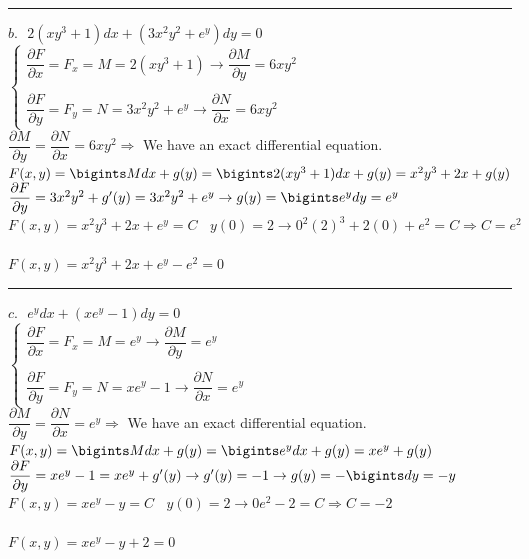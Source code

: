 \documentclass[fleqn]{article}
\begin{document}
\begin{enumerate}
      \textcolor{hwColor}{  
        \rule{15cm}{0.4pt}  
      }

      \textcolor{hwColor}{ 
        $b. ~~~ 2(xy^3+1)dx+(3x^2y^2+e^y)dy=0$ \\
        $
        \begin{cases}
          \dfrac{\partial F}{\partial x}=F_x=M=2(xy^3+1) \rightarrow \dfrac{\partial M}{\partial y}=6xy^2 \\
          \\
          \dfrac{\partial F}{\partial y}=F_y=N=3x^2y^2+e^y \rightarrow \dfrac{\partial N}{\partial x}=6xy^2
        \end{cases}
        $ \\
        $\dfrac{\partial M}{\partial y}=\dfrac{\partial N}{\partial x}=6xy^2 \Longrightarrow$ We have an exact differential equation. \\
        $F(x,y)=\bigints Mdx+g(y)=\bigints 2(xy^3+1) dx+g(y)=x^2y^3+2x+g(y)$ \\
        $\dfrac{\partial F}{\partial y}=3x^2y^2+g^{\prime}(y)=3x^2y^2+e^y \rightarrow g(y)=\bigints e^ydy=e^y$ \\
        $F(x,y)=x^2y^3+2x+e^y=C ~~~~ y(0)=2 \rightarrow 0^2(2)^3+2(0)+e^2=C \Longrightarrow C=e^2$ \\
        \\
        $F(x,y)=x^2y^3+2x+e^y-e^2=0$
      }

      \textcolor{hwColor}{  
        \rule{15cm}{0.4pt}  
      }

      \textcolor{hwColor}{ 
        $c. ~~~ e^ydx+(xe^y-1)dy=0 $ \\
        $
        \begin{cases}
          \dfrac{\partial F}{\partial x}=F_x=M=e^y \rightarrow \dfrac{\partial M}{\partial y}=e^y \\
          \\
          \dfrac{\partial F}{\partial y}=F_y=N=xe^y-1 \rightarrow \dfrac{\partial N}{\partial x}=e^y
        \end{cases}
        $ \\
        $\dfrac{\partial M}{\partial y}=\dfrac{\partial N}{\partial x}=e^y \Longrightarrow$ We have an exact differential equation. \\
        $F(x,y)=\bigints Mdx+g(y)=\bigints e^y dx+g(y)=xe^y+g(y)$ \\
        $\dfrac{\partial F}{\partial y}=xe^y-1=xe^y+g^{\prime}(y) \rightarrow g^{\prime}(y)=-1 \rightarrow g(y)=-\bigints dy=-y$ \\
        $F(x,y)=xe^y-y=C ~~~~ y(0)=2 \rightarrow 0e^2-2=C \Longrightarrow C=-2$ \\
        \\
        $F(x,y)=xe^y-y+2=0$
      }
    

\end{enumerate}
\end{document}
